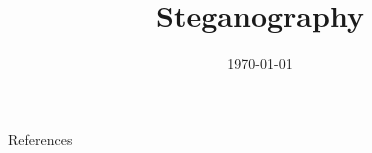 \documentclass[aspectratio=169]{beamer}
\title{Steganography}
\subtitle{\coursetitle}
\author{\instructor}
\date{\today}
\begin{document}
\begin{frame}
\titlepage
\end{frame}

\navoverview







\begin{frame}[allowframebreaks]{References}
\printbibliography[heading=none]
\end{frame}
\end{document}
